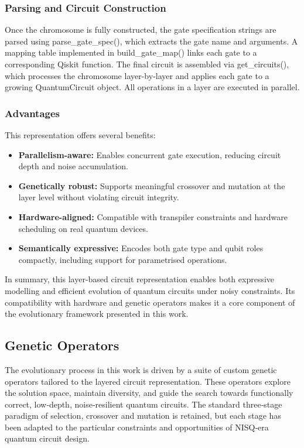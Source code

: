 \documentclass[11pt,a4paper]{article}
\begin{document}
\subsubsection*{Parsing and Circuit Construction}
Once the chromosome is fully constructed, the gate specification strings are parsed using parse\_gate\_spec(), which extracts the gate name and arguments. A mapping table implemented in build\_gate\_map() links each gate to a corresponding Qiskit function. The final circuit is assembled via get\_circuits(), which processes the chromosome layer-by-layer and applies each gate to a growing QuantumCircuit object. All operations in a layer are executed in parallel.

\subsubsection*{Advantages}

This representation offers several benefits:
\begin{itemize}
    \item \textbf{Parallelism-aware:} Enables concurrent gate execution, reducing circuit depth and noise accumulation.
    \item \textbf{Genetically robust:} Supports meaningful crossover and mutation at the layer level without violating circuit integrity.
    \item \textbf{Hardware-aligned:} Compatible with transpiler constraints and hardware scheduling on real quantum devices.
    \item \textbf{Semantically expressive:} Encodes both gate type and qubit roles compactly, including support for parametrised operations.
\end{itemize}

In summary, this layer-based circuit representation enables both expressive modelling and efficient evolution of quantum circuits under noisy constraints. Its compatibility with hardware and genetic operators makes it a core component of the evolutionary framework presented in this work.

\subsection{Genetic Operators}
The evolutionary process in this work is driven by a suite of custom genetic operators tailored to the layered circuit representation. These operators explore the solution space, maintain diversity, and guide the search towards functionally correct, low‐depth, noise‐resilient quantum circuits. The standard three‐stage paradigm of selection, crossover and mutation is retained, but each stage has been adapted to the particular constraints and opportunities of NISQ‐era quantum circuit design.
\end{document}
